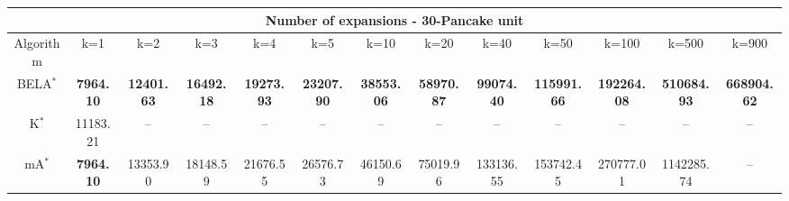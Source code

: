 \begin{tabular}{c|cccccccccccc}\toprule
\multicolumn{13}{c}{Number of expansions - 30-Pancake unit}\\ \midrule
Algorithm & k=1 & k=2 & k=3 & k=4 & k=5 & k=10 & k=20 & k=40 & k=50 & k=100 & k=500 & k=900 \\ \midrule
BELA$^*$ & \textbf{7964.10} & \textbf{12401.63} & \textbf{16492.18} & \textbf{19273.93} & \textbf{23207.90} & \textbf{38553.06} & \textbf{58970.87} & \textbf{99074.40} & \textbf{115991.66} & \textbf{192264.08} & \textbf{510684.93} & \textbf{668904.62} \\
K$^*$ & 11183.21 & -- & -- & -- & -- & -- & -- & -- & -- & -- & -- & -- \\
mA$^*$ & \textbf{7964.10} & 13353.90 & 18148.59 & 21676.55 & 26576.73 & 46150.69 & 75019.96 & 133136.55 & 153742.45 & 270777.01 & 1142285.74 & -- \\ \bottomrule 
\end{tabular}
